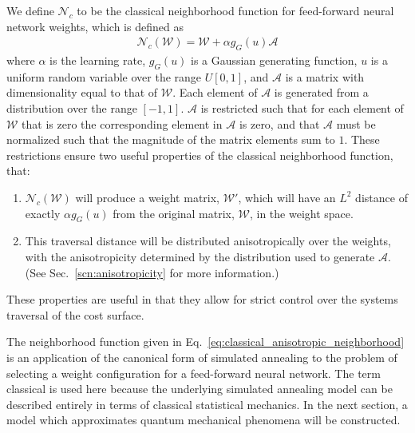 \documentclass[10pt,journal,cspaper,compsoc]{IEEEtran}
\begin{document}
We define \begin{math}\mathcal{N}_{c}\end{math} to be the classical neighborhood function for feed-forward neural network weights, which is defined as \begin{align}\label{eq:classical_anisotropic_neighborhood}
	\mathcal{N}_{c} (\boldsymbol{\mathcal{W}}) = \boldsymbol{\mathcal{W}} + \alpha g_{G}(u) \boldsymbol{\mathcal{A}} 
\end{align}
\noindent where $\alpha$ is the learning rate, $g_{G}(u)$ is a Gaussian generating function, $u$ is a uniform random variable over the range $U[0,1]$, and $\boldsymbol{\mathcal{A}}$ is a matrix with dimensionality equal to that of $\boldsymbol{\mathcal{W}}$. Each element of $\boldsymbol{\mathcal{A}}$ is generated from a distribution over the range $[-1,1]$.  $\boldsymbol{\mathcal{A}}$ is restricted such that for each element of $\boldsymbol{\mathcal{W}}$ that is zero the corresponding element in $\boldsymbol{\mathcal{A}}$ is zero, and that $\boldsymbol{\mathcal{A}}$ must be normalized such that the magnitude of the matrix elements sum to $1$. These restrictions ensure two useful properties of the classical neighborhood function, that: 

\begin{enumerate}
	\item $\mathcal{N}_{c} (\boldsymbol{\mathcal{W}})$ will produce a weight matrix, $\boldsymbol{\mathcal{W}'}$, which will have an $L^2$ distance of exactly $\alpha g_{G}(u)$ from the original matrix, $\boldsymbol{\mathcal{W}}$, in the weight space.
	\item This traversal distance will be distributed anisotropically over the weights, with the anisotropicity determined by the distribution used to generate $\boldsymbol{\mathcal{A}}$. (See Sec.~\ref{scn:anisotropicity} for more information.)
\end{enumerate}
These properties are useful in that they allow for strict control over the systems traversal of the cost surface. 

The neighborhood function given in Eq.~\ref{eq:classical_anisotropic_neighborhood} is an application of the canonical form of simulated annealing to the problem of selecting a weight configuration for a feed-forward neural network. The term classical is used here because the underlying simulated annealing model can be described entirely in terms of classical statistical mechanics. In the next section, a model which approximates quantum mechanical phenomena will be constructed.
\end{document}
